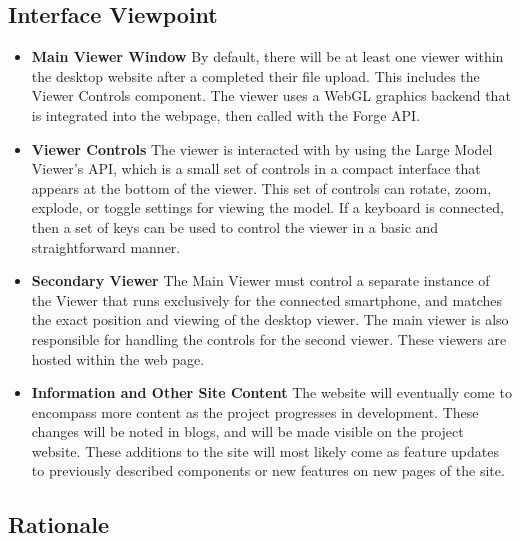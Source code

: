 \documentclass[letterpaper, 10pt, draftclsnofoot, compsoc, onecolumn]{IEEEtran}
\begin{document}
\subsection{Interface Viewpoint}
\begin{itemize}
	\item[]\textbf{Main Viewer Window} By default, there will be at least one viewer within the desktop website after a completed their file upload. This includes the Viewer Controls component. The viewer uses a WebGL graphics backend that is integrated into the webpage, then called with the Forge API.
	\item[]\textbf{Viewer Controls} The viewer is interacted with by using the Large Model Viewer's API, which is a small set of controls in a compact interface that appears at the bottom of the viewer. This set of controls can rotate, zoom, explode, or toggle settings for viewing the model. If a keyboard is connected, then a set of keys can be used to control the viewer in a basic and straightforward manner.
	\item[]\textbf{Secondary Viewer}  The Main Viewer must control a separate instance of the Viewer that runs exclusively for the connected smartphone, and matches the exact position and viewing of the desktop viewer. The main viewer is also responsible for handling the controls for the second viewer. These viewers are hosted within the web page.

	\item[]\textbf{Information and Other Site Content} The website will eventually come to encompass more content as the project progresses in development. These changes will be noted in blogs, and will be made visible on the project website. These additions to the site will most likely come as feature updates to previously described components or new features on new pages of the site.
\end{itemize}
\subsection{Rationale}

\end{document}
